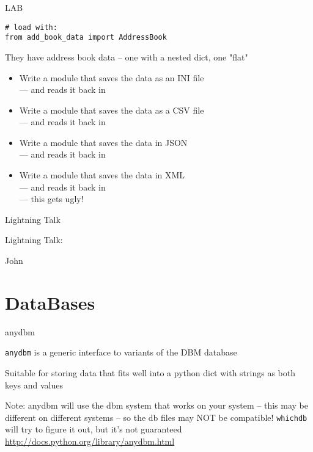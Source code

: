 \documentclass{beamer}
\begin{document}
\begin{frame}[fragile]{LAB}

\begin{verbatim}
# load with:
from add_book_data import AddressBook
\end{verbatim}

They have address book data -- one with a nested dict, one "flat"

\begin{itemize}
  \item Write a module that saves the data as an INI file\\
        --- and reads it back in
  \item Write a module that saves the data as a CSV file\\
        --- and reads it back in
  \item Write a module that saves the data in JSON\\
        --- and reads it back in
  \item Write a module that saves the data in XML\\
        --- and reads it back in \\
        --- this gets ugly!
\end{itemize}

\end{frame}

\begin{frame}{Lightning Talk}

{\centering

\vfill
{\LARGE Lightning Talk:  }

\vfill
{\Huge John}

\vfill
}
\end{frame}



\section{DataBases} 

\begin{frame}[fragile]{anydbm}

\vfill
{\Large \verb|anydbm| is a generic interface to variants of the DBM database}

\vfill
{\Large Suitable for storing data that fits well into a python dict with strings as both keys and values}

\vfill
{\Large Note: anydbm will use the dbm system that works on your system --
        this may be different on different systems -- so the db files may NOT
        be compatible! \verb|whichdb| will try to figure it out, but it's not
        guaranteed}
\vfill
\url{http://docs.python.org/library/anydbm.html}
\end{frame} 
\end{document}
